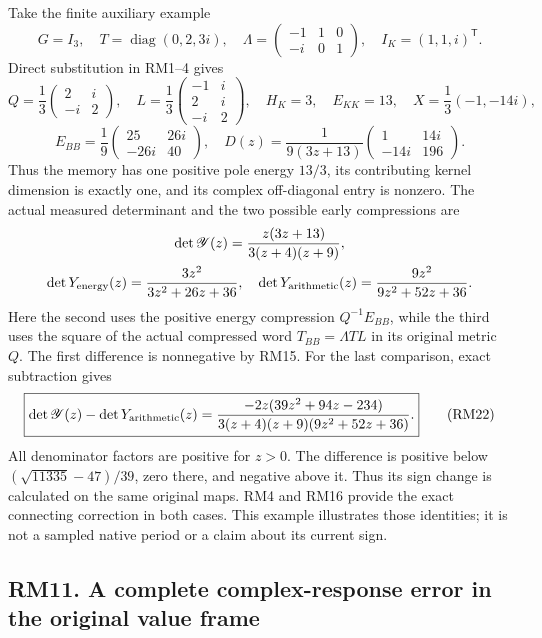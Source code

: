 \documentclass[11pt]{article}
\begin{document}
Take the finite auxiliary example \[
 G=I_3,\quad T=\operatorname{diag}(0,2,3i),\quad
 \Lambda=\begin{pmatrix}-1&1&0\\-i&0&1\end{pmatrix},\quad
 I_K=(1,1,i)^{\mathsf T}.
\] Direct substitution in RM1--4 gives \[
 Q=\frac13\begin{pmatrix}2&i\\-i&2\end{pmatrix},\quad
 L=\frac13\begin{pmatrix}-1&i\\2&i\\-i&2\end{pmatrix},\quad
 H_K=3,\quad E_{KK}=13,\quad X=\frac13(-1,-14i),
\] \[
 E_{BB}=\frac19\begin{pmatrix}25&26i\\-26i&40\end{pmatrix},\quad
 D(z)=\frac1{9(3z+13)}\begin{pmatrix}1&14i\\-14i&196\end{pmatrix}.
\] Thus the memory has one positive pole energy \(13/3\), its contributing kernel dimension is exactly one, and its complex off-diagonal entry is nonzero. The actual measured determinant and the two possible early compressions are \[
\begin{gathered}
 \det\mathscr Y(z)=\frac{z(3z+13)}{3(z+4)(z+9)},\\
 \det Y_{\rm energy}(z)=\frac{3z^2}{3z^2+26z+36},\quad
 \det Y_{\rm arithmetic}(z)=\frac{9z^2}{9z^2+52z+36}.
 \end{gathered}
\] Here the second uses the positive energy compression \(Q^{-1}E_{BB}\), while the third uses the square of the actual compressed word \(T_{BB}=\Lambda TL\) in its original metric \(Q\). The first difference is nonnegative by RM15. For the last comparison, exact subtraction gives \[
 \boxed{\det\mathscr Y(z)-\det Y_{\rm arithmetic}(z)
 =\frac{-2z(39z^2+94z-234)}{3(z+4)(z+9)(9z^2+52z+36)}.}
 \tag{RM22}
\] All denominator factors are positive for \(z>0\). The difference is positive below \((\sqrt{11335}-47)/39\), zero there, and negative above it. Thus its sign change is calculated on the same original maps. RM4 and RM16 provide the exact connecting correction in both cases. This example illustrates those identities; it is not a sampled native period or a claim about its current sign.

\subsection{RM11. A complete complex-response error in the original value frame}\label{rm11.-a-complete-complex-response-error-in-the-original-value-frame}
\end{document}
